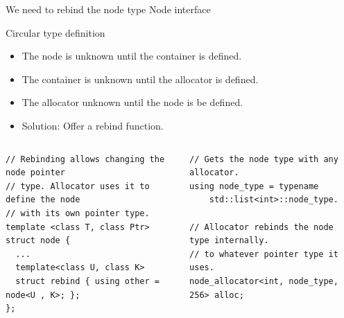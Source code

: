 \documentclass[10pt,aspectratio=169]{beamer}
\begin{document}
\begin{frame}[fragile]
{We need to rebind the node type}
{Node interface}

\begin{block}{Circular type definition}
\begin{itemize}
\item The node is unknown until the container is defined.
\item The container is unknown until the allocator is defined.
\item The allocator unknown until the node is be defined.
\item {\color{alertc}Solution: Offer a rebind function.}
\end{itemize}
\end{block}

\begin{columns}
\begin{column}[t]{0.47\textwidth}
\begin{lstlisting}
// Rebinding allows changing the node pointer
// type. Allocator uses it to define the node
// with its own pointer type.
template <class T, class Ptr>
struct node {
  ...
  template<class U, class K>
  struct rebind { using other = node<U , K>; };
};

\end{lstlisting}

\end{column}

\begin{column}[t]{0.47\textwidth}
\begin{lstlisting}
// Gets the node type with any allocator.
using node_type = typename
    std::list<int>::node_type.

// Allocator rebinds the node type internally.
// to whatever pointer type it uses.
node_allocator<int, node_type, 256> alloc;
\end{lstlisting}
\end{column}
\end{columns}
\end{frame}
\end{document}
